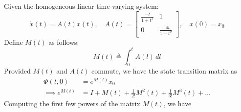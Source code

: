Given the homogeneous linear time-varying system:
\begin{equation*}
    \dot{x}(t)
    =
    A(t) x(t),
    \quad
    A(t)
    =
    \begin{bmatrix}
        \frac{-t}{1+t^2} & 1                 \\
        0                & \frac{-4t}{1+t^2}
    \end{bmatrix},
    \quad
    x(0) = x_0
\end{equation*}
Define \( M(t) \) as follows:
\begin{equation*}
    M(t)
    \triangleq
    \int_{0}^{t} A(l) \, dl
\end{equation*}
Provided \( M(t) \) and \( A(t) \) commute, we have the state transition matrix as
\begin{align*}
    \Phi(t, 0)
     & =
    e^{M(t)} x_0
    \\
    \implies
    e^{M(t)}
     & =
    I + M(t) + \frac{1}{2!} M^2(t) + \frac{1}{3!} M^3(t) + \ldots
\end{align*}
Computing the first few powers of the matrix \( M(t) \), we have
